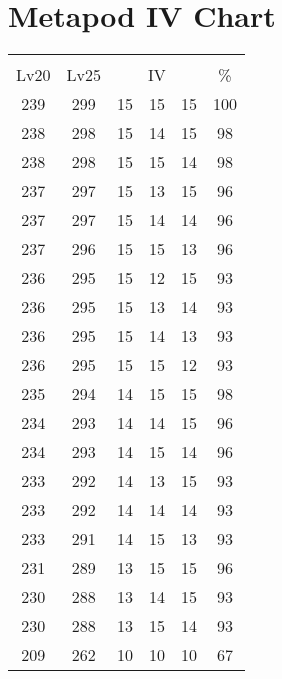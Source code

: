 \documentclass{article}%
\begin{document}
%
\normalsize%
\section{Metapod IV Chart}%
\label{sec:Metapod IV Chart}%
\renewcommand{\arraystretch}{1.5}%
\begin{tabular}{|c|c|c|c|c|c|}%
\hline%
\multicolumn{6}{|c|}{\textcolor{white}{ 
\linebreak{Metapod}
}%
\cellcolor{black}}\\%
\multicolumn{1}{|c}{Lv20}&\multicolumn{1}{c|}{Lv25}&\multicolumn{3}{c|}{IV}&\multicolumn{1}{|c|}{\%}\\%
\hline%
\rowcolor{color100}%
239&299&15&15&15&100\\%
\hline%
\rowcolor{color98}%
238&298&15&14&15&98\\%
\hline%
\rowcolor{color98}%
238&298&15&15&14&98\\%
\hline%
\rowcolor{color96}%
237&297&15&13&15&96\\%
\hline%
\rowcolor{color96}%
237&297&15&14&14&96\\%
\hline%
\rowcolor{color96}%
237&296&15&15&13&96\\%
\hline%
\rowcolor{color93}%
236&295&15&12&15&93\\%
\hline%
\rowcolor{color93}%
236&295&15&13&14&93\\%
\hline%
\rowcolor{color93}%
236&295&15&14&13&93\\%
\hline%
\rowcolor{color93}%
236&295&15&15&12&93\\%
\hline%
\rowcolor{color98}%
235&294&14&15&15&98\\%
\hline%
\rowcolor{color96}%
234&293&14&14&15&96\\%
\hline%
\rowcolor{color96}%
234&293&14&15&14&96\\%
\hline%
\rowcolor{color93}%
233&292&14&13&15&93\\%
\hline%
\rowcolor{color93}%
233&292&14&14&14&93\\%
\hline%
\rowcolor{color93}%
233&291&14&15&13&93\\%
\hline%
\rowcolor{color96}%
231&289&13&15&15&96\\%
\hline%
\rowcolor{color93}%
230&288&13&14&15&93\\%
\hline%
\rowcolor{color93}%
230&288&13&15&14&93\\%
\hline%
\rowcolor{color91}%
209&262&10&10&10&67\\%
\end{tabular}

%
\end{document}

